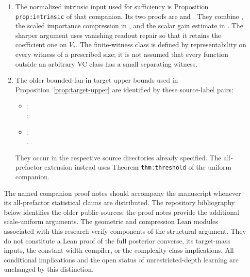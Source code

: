 \documentclass[11pt]{article}
\theoremstyle{remark}
\begin{document}
\begin{enumerate}[leftmargin=*]
sources. The short-padding proof appears directly in the companion's
Section 4.
\item The normalized intrinsic input used for sufficiency is Proposition
\texttt{prop:intrinsic} of that companion. Its two proofs are
 and
. They combine
, the scaled importance compression
in , and the scalar gain estimate in
. The sharper argument uses vanishing
readout repair so that it retains the coefficient one on $V_*$.
The finite-witness class is defined by representability on every witness
of a prescribed size; it is not assumed that every function outside an
arbitrary VC class has a small separating witness.
\item The older bounded-fan-in target upper bounds used in
Proposition~\ref{prop:target-upper} are identified by these source-label pairs:
\begin{itemize}
\item {}:\\
;
\item {}:\\
.
\end{itemize}
They occur in the respective source directories already specified. The all-prefactor extension instead uses
Theorem \texttt{thm:threshold} of the uniform companion.
\end{enumerate}

The named companion proof notes should accompany the manuscript whenever
its all-prefactor statistical claims are distributed. The repository
bibliography below identifies the older public sources; the proof notes
provide the additional scale-uniform arguments.
The geometric and compression Lean modules associated with this research
verify components of the structural argument. They do not constitute a
Lean proof of the full posterior converse, its target-mass inputs, the
constant-width compiler, or the complexity-class implications.
All conditional implications and the open status of unrestricted-depth
learning are unchanged by this distinction.
\end{document}
